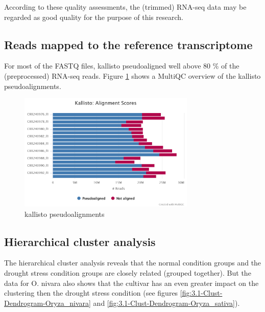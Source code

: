 According to these quality assessments, the (trimmed) RNA-seq data may be regarded as good quality for the purpose of this research.


\subsection{Reads mapped to the reference transcriptome}

For most of the FASTQ files, kallisto pseudoaligned well above 80 \% of the (preprocessed) RNA-seq reads. Figure \ref{fig:0.3-MultiQC_kallisto_alignment} shows a MultiQC overview of the kallisto pseudoalignments.

\begin{figure}[htbp]
    \caption{kallisto pseudoalignments}
    \label{fig:0.3-MultiQC_kallisto_alignment}
    \includegraphics[width=0.75\textwidth]{../../results/multiqc/Plot-Exports/kallisto_alignment}
\end{figure}


\subsection{Hierarchical cluster analysis}

The hierarchical cluster analysis reveals that the normal condition groups and the drought stress condition groups are closely related (grouped together). But the data for O. nivara also shows that the cultivar has an even greater impact on the clustering then the drought stress condition (see figures \ref{fig:3.1-Clust-Dendrogram-Oryza_nivara} and \ref{fig:3.1-Clust-Dendrogram-Oryza_sativa}).

